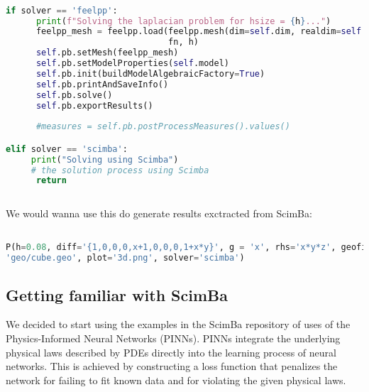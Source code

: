 \documentclass[12pt]{article}
\begin{document}
\begin{lstlisting}[language=Python,caption={},frame=single, backgroundcolor=\color{gray!10}, basicstyle=\footnotesize,rulecolor=\color{blue}, framexleftmargin=3pt, commentstyle=\color{mygreen}, keywordstyle=\color{blue}]

if solver == 'feelpp':
      print(f"Solving the laplacian problem for hsize = {h}...")
      feelpp_mesh = feelpp.load(feelpp.mesh(dim=self.dim, realdim=self.dim), 
                                fn, h)
      self.pb.setMesh(feelpp_mesh)
      self.pb.setModelProperties(self.model)
      self.pb.init(buildModelAlgebraicFactory=True)
      self.pb.printAndSaveInfo()
      self.pb.solve()
      self.pb.exportResults()
    
      #measures = self.pb.postProcessMeasures().values()

elif solver == 'scimba':
     print("Solving using Scimba")
     # the solution process using Scimba
      return
      
\end{lstlisting}

We would wanna use this do generate results exctracted from ScimBa:

\begin{lstlisting}[language=Python,caption={},frame=single, backgroundcolor=\color{gray!10}, basicstyle=\footnotesize,rulecolor=\color{blue}, framexleftmargin=3pt, commentstyle=\color{mygreen}, keywordstyle=\color{blue}]

P(h=0.08, diff='{1,0,0,0,x+1,0,0,0,1+x*y}', g = 'x', rhs='x*y*z', geofile = 
'geo/cube.geo', plot='3d.png', solver='scimba') 

\end{lstlisting}

\newpage

\subsection{Getting familiar with ScimBa}

We decided to start using the examples in the ScimBa repository of uses of the Physics-Informed Neural Networks (PINNs). PINNs integrate the underlying physical laws described by PDEs directly into the learning process of neural networks. This is achieved by constructing a loss function that penalizes the network for failing to fit known data and for violating the given physical laws.
\end{document}
